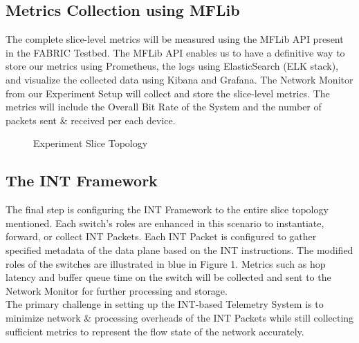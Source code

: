 \documentclass[conference]{IEEEtran}
\begin{document}
\subsection{Metrics Collection using MFLib}
The complete slice-level metrics will be measured using the MFLib API present in the FABRIC Testbed. The MFLib API enables us to have a definitive way to store our metrics using Prometheus, the logs using ElasticSearch (ELK stack), and visualize the collected data using Kibana and Grafana. The Network Monitor from our Experiment Setup will collect and store the slice-level metrics. The metrics will include the Overall Bit Rate of the System and the number of packets sent \& received per each device.

\begin{figure}
	\centering
	\caption{Experiment Slice Topology}
	\label{fig}
\end{figure} 

\subsection{The INT Framework}
The final step is configuring the INT Framework to the entire slice topology mentioned. Each switch's roles are enhanced in this scenario to instantiate, forward, or collect INT Packets. Each INT Packet is configured to gather specified metadata of the data plane based on the INT instructions. The modified roles of the switches are illustrated in blue in Figure 1. Metrics such as hop latency and buffer queue time on the switch will be collected and sent to the Network Monitor for further processing and storage. \\
The primary challenge in setting up the INT-based Telemetry System is to minimize network \& processing overheads of the INT Packets while still collecting sufficient metrics to represent the flow state of the network accurately.
\end{document}
